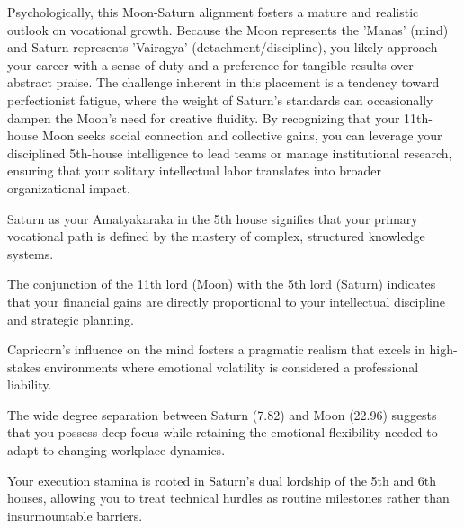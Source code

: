 {\fontsize{9}{13}\selectfont Psychologically, this Moon-Saturn alignment fosters a mature and realistic outlook on vocational growth. Because the Moon represents the 'Manas' (mind) and Saturn represents 'Vairagya' (detachment/discipline), you likely approach your career with a sense of duty and a preference for tangible results over abstract praise. The challenge inherent in this placement is a tendency toward perfectionist fatigue, where the weight of Saturn's standards can occasionally dampen the Moon's need for creative fluidity. By recognizing that your 11th-house Moon seeks social connection and collective gains, you can leverage your disciplined 5th-house intelligence to lead teams or manage institutional research, ensuring that your solitary intellectual labor translates into broader organizational impact.}\par\vspace{1.8mm}

\begin{diamondlist}
  \item {\fontsize{8.5}{12}\selectfont Saturn as your Amatyakaraka in the 5th house signifies that your primary vocational path is defined by the mastery of complex, structured knowledge systems.}
  \item {\fontsize{8.5}{12}\selectfont The conjunction of the 11th lord (Moon) with the 5th lord (Saturn) indicates that your financial gains are directly proportional to your intellectual discipline and strategic planning.}
  \item {\fontsize{8.5}{12}\selectfont Capricorn's influence on the mind fosters a pragmatic realism that excels in high-stakes environments where emotional volatility is considered a professional liability.}
  \item {\fontsize{8.5}{12}\selectfont The wide degree separation between Saturn (7.82\textdegree{}) and Moon (22.96\textdegree{}) suggests that you possess deep focus while retaining the emotional flexibility needed to adapt to changing workplace dynamics.}
  \item {\fontsize{8.5}{12}\selectfont Your execution stamina is rooted in Saturn's dual lordship of the 5th and 6th houses, allowing you to treat technical hurdles as routine milestones rather than insurmountable barriers.}
\end{diamondlist}


